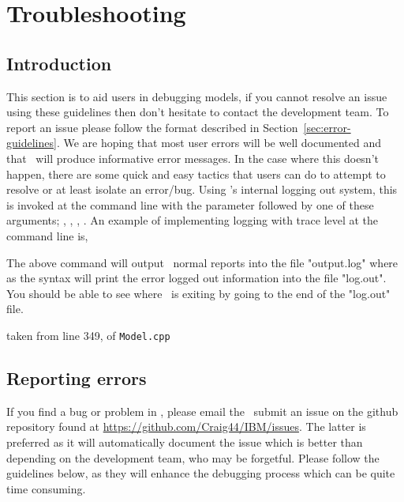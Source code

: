 \section{Troubleshooting\label{sec:trouble-shooting}}

\subsection{Introduction}
This section is to aid users in debugging models, if you cannot resolve an issue using these guidelines then don't hesitate to contact the development team. To report an issue please follow the format described in Section~\ref{sec:error-guidelines}. We are hoping that most user errors will be well documented and that \IBM\ will produce informative error messages. In the case where this doesn't happen, there are some quick and easy tactics that users can do to attempt to resolve or at least isolate an error/bug. Using \IBM's internal logging out system, this is invoked at the command line with the  parameter followed by one of these arguments; , , , . An example of implementing logging with trace level at the command line is,


The above command will output \IBM\ normal reports into the file "output.log" where as the  syntax will print the error logged out information into the file "log.out". You should be able to see where \IBM\ is exiting by going to the end of the "log.out" file. 



taken from line 349, of \texttt{Model.cpp}


\subsection{Reporting errors\label{sec:reporting-errors}}

If you find a bug or problem in \IBM , please email the \emaillink\  submit an issue on the github repository found at \url{https://github.com/Craig44/IBM/issues}. The latter is preferred as it will automatically document the issue which is better than depending on the development team, who may be forgetful. Please follow the guidelines below, as they will enhance the debugging process which can be quite time consuming.

